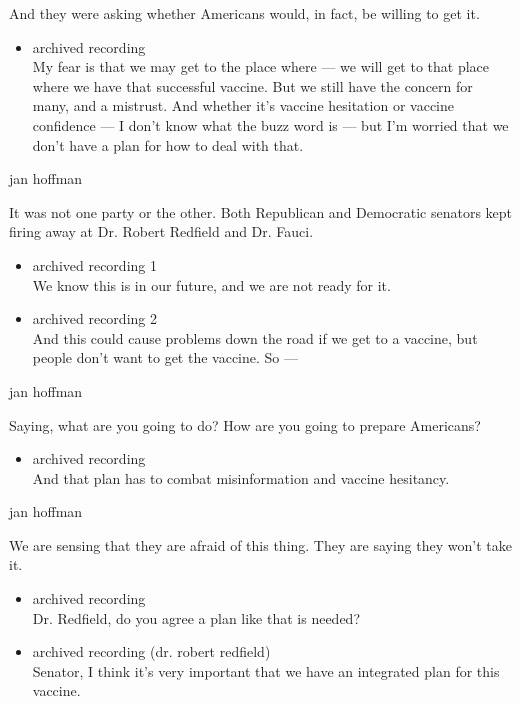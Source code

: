 And they were asking whether Americans would, in fact, be willing to get
it.

\begin{itemize}
\tightlist
\item
  archived recording\\
  My fear is that we may get to the place where --- we will get to that
  place where we have that successful vaccine. But we still have the
  concern for many, and a mistrust. And whether it's vaccine hesitation
  or vaccine confidence --- I don't know what the buzz word is --- but
  I'm worried that we don't have a plan for how to deal with that.
\end{itemize}

jan hoffman

It was not one party or the other. Both Republican and Democratic
senators kept firing away at Dr. Robert Redfield and Dr. Fauci.

\begin{itemize}
\item
  archived recording 1\\
  We know this is in our future, and we are not ready for it.
\item
  archived recording 2\\
  And this could cause problems down the road if we get to a vaccine,
  but people don't want to get the vaccine. So ---
\end{itemize}

jan hoffman

Saying, what are you going to do? How are you going to prepare
Americans?

\begin{itemize}
\tightlist
\item
  archived recording\\
  And that plan has to combat misinformation and vaccine hesitancy.
\end{itemize}

jan hoffman

We are sensing that they are afraid of this thing. They are saying they
won't take it.

\begin{itemize}
\item
  archived recording\\
  Dr. Redfield, do you agree a plan like that is needed?
\item
  archived recording (dr. robert redfield)\\
  Senator, I think it's very important that we have an integrated plan
  for this vaccine.
\end{itemize}

